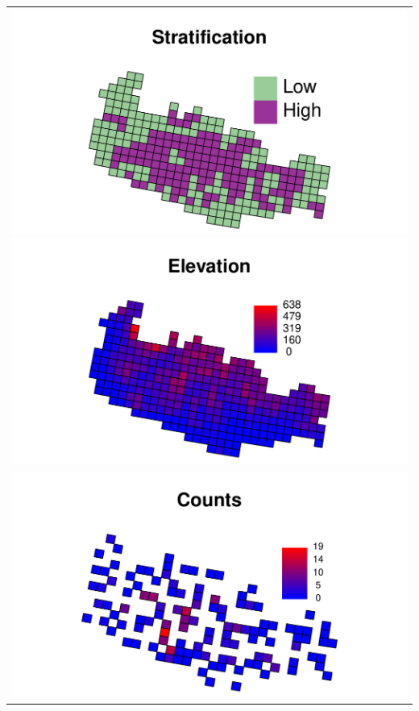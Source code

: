 \documentclass[mathserif,compress]{beamer}\usepackage{graphicx, color}
\makeatletter
\def\maxwidth{ %
  \ifdim\Gin@nat@width>\linewidth
    \linewidth
  \else
    \Gin@nat@width
  \fi
}
\makeatother
\begin{document}
\begin{frame}[fragile]
	\vspace{-.1cm}
	\begin{tabular}{c}
			\includegraphics[width=.5\maxwidth]{figure/mooseStrat-plot} 
			\includegraphics[width=.5\maxwidth]{figure/mooseElev-plot} \\
			\includegraphics[width=.6\maxwidth]{figure/mooseCounts-plot} 
	\end{tabular}

\end{frame}
\end{document}
